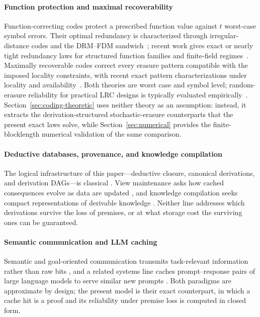 \documentclass[journal]{IEEEtran}
\numberwithin{equation}{section}
\begin{document}
\paragraph*{Function protection and maximal recoverability}
Function-correcting codes protect a prescribed function value against \(t\)
worst-case symbol errors.  Their optimal redundancy is characterized through
irregular-distance codes and the DRM--FDM
sandwich~\cite{lenz2023function,rajput2026function}; recent work gives exact
or nearly tight redundancy laws for structured function families and
finite-field regimes~\cite{premlal2025function,zhang2025optimal,ly2025redundancy,verma2026function}.
Maximally recoverable codes correct every erasure pattern compatible with
the imposed locality constraints, with recent exact pattern
characterizations under locality and
availability~\cite{gopi2020maximally,martinez2026maximally}.  Both theories
are worst case and symbol level; random-erasure reliability for practical
LRC designs is typically evaluated empirically~\cite{kadekodi2023wide}.
Section~\ref{sec:coding-theoretic} uses neither theory as an assumption:
instead, it extracts the derivation-structured stochastic-erasure
counterparts that the present exact laws solve, while
Section~\ref{sec:numerical} provides the finite-blocklength numerical
validation of the same comparison.

\paragraph*{Deductive databases, provenance, and knowledge compilation}
The logical infrastructure of this paper---deductive closure, canonical
derivations, and derivation DAGs---is classical
\cite{abiteboul1995foundations,ullman1988database,dantsin2001complexity,green2007provenance,cheney2009provenance}.
View maintenance asks how cached consequences evolve as data are updated
\cite{gupta1997materialized}, and knowledge compilation seeks compact
representations of derivable knowledge
\cite{darwiche2002knowledge,brachman2004knowledge,eiter2009answer,krotzsch2025modern}.
Neither line addresses which derivations survive the loss of premises, or at
what storage cost the surviving ones can be guaranteed.

\paragraph*{Semantic communication and LLM caching}
Semantic and goal-oriented communication transmits task-relevant information
rather than raw bits
\cite{yang2023semantic,xin2024semantic,yu2023semantic}, and a related systems
line caches prompt--response pairs of large language models to serve similar
new prompts \cite{bang2023gptcache,gill2024meancache,li2024scalm}.  Both
paradigms are approximate by design; the present model is their exact
counterpart, in which a cache hit is a proof and its reliability under
premise loss is computed in closed form.
\end{document}
